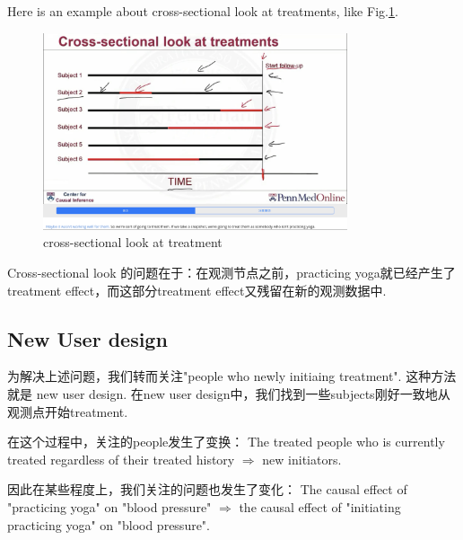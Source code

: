 Here is an example about cross-sectional look
at treatments, like Fig.\ref{cstrt}.
\begin{figure}[htbp]
	\setlength{\abovecaptionskip}{0pt}     %
	\setlength{\belowcaptionskip}{10pt}
	\vspace{-0cm}  %
	\setlength{\abovecaptionskip}{0pt}   %
	\setlength{\belowcaptionskip}{-5pt}   %
	\centering
	\includegraphics[width=0.8\textwidth]{figure/cstrt.jpg} 
	\caption{cross-sectional look at treatment}
	\label{cstrt}
\end{figure} 
Cross-sectional look 的问题在于：在观测节点之前，practicing yoga就已经产生了treatment effect，而这部分treatment effect又残留在新的观测数据中.

\subsection{New User design}
为解决上述问题，我们转而关注"people who newly initiaing treatment". 这种方法就是{\color{red} new user design}. 在new user design中，我们找到一些subjects刚好一致地从观测点开始treatment.

在这个过程中，关注的people发生了变换：
The treated people who is currently treated regardless of their treated history $\Longrightarrow$ new initiators. 

因此在某些程度上，我们关注的问题也发生了变化：
The causal effect of "practicing yoga" on "blood pressure" $\Longrightarrow$ the causal effect of "initiating practicing yoga" on "blood pressure". 

